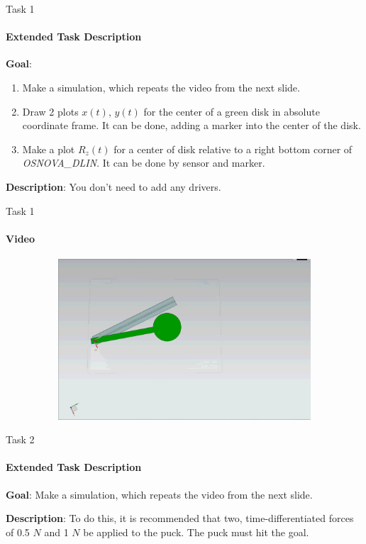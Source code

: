 \documentclass[aspectratio=169]{beamer}
\begin{document}
\begin{frame}[t]{Task 1}
    \framesubtitle{Extended Task Description}
    \textbf{Goal}: \begin{enumerate}
        \item Make a simulation, which repeats the video from the next slide.
        \item Draw 2 plots $x(t)$, $y(t)$ for the center of a green disk in absolute coordinate frame. It can be done, adding a marker into the center of the disk.
        \item Make a plot $R_z(t)$ for a center of disk relative to a right bottom corner of \textit{OSNOVA\_DLIN}. It can be done by sensor and marker.
    \end{enumerate}
    \smallskip

    \textbf{Description}: You don't need to add any drivers. 
\end{frame}

\begin{frame}[t]{Task 1}
    \framesubtitle{Video}
    \vspace{-0.6cm}
    \begin{figure}[H]
        \href{https://disk.yandex.ru/i/-vrZe2tMoOiVMQ}{
            \centering\includegraphics[height=6cm,width=1\textwidth,keepaspectratio]{1_preview.png}}
        \label{fig:1_preview.png}
    \end{figure}
\end{frame}


\begin{frame}[t]{Task 2}
    \framesubtitle{Extended Task Description}
    \textbf{Goal}: Make a simulation, which repeats the video from the next slide.
    \smallskip

    \textbf{Description}: To do this, it is recommended that two, time-differentiated forces of 0.5 $N$ and 1 $N$ be applied to the puck. The puck must hit the goal.
\end{frame}
\end{document}
